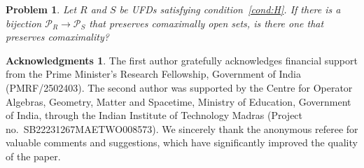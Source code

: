 \documentclass[12pt,reqno,a4paper]{amsart}
\newcommand{\Pe}{\mathcal{P}}
\theoremstyle{plain}
\newtheorem{problem}[theorem]{Problem}
\theoremstyle{definition}
\newtheorem*{acknow}{\textup{Acknowledgments}}
\begin{document}
\begin{problem}\label{prob:ufd}
Let $R$ and $S$ be UFDs satisfying condition~\ref{cond:H}. If there is a bijection $\Pe_R\to\Pe_S$ that preserves comaximally open sets, is there one that preserves comaximality?
\end{problem}


\begin{acknow}
The first author gratefully acknowledges financial support from the Prime Minister's Research Fellowship, Government of India (PMRF/2502403). The second author was supported by the Centre for Operator Algebras, Geometry, Matter and Spacetime, Ministry of Education, Government of India, through the Indian Institute of Technology Madras (Project no.\ SB22231267MAETWO008573). We sincerely thank the anonymous referee for valuable comments and suggestions, which have significantly improved the quality of the paper.
\end{acknow}
 

\end{document}
